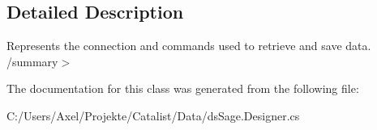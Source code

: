 \subsection{Detailed Description}
Represents the connection and commands used to retrieve and save data. /summary$>$ 

The documentation for this class was generated from the following file\+:\begin{DoxyCompactItemize}
\item 
C\+:/\+Users/\+Axel/\+Projekte/\+Catalist/\+Data/ds\+Sage.\+Designer.\+cs\end{DoxyCompactItemize}
